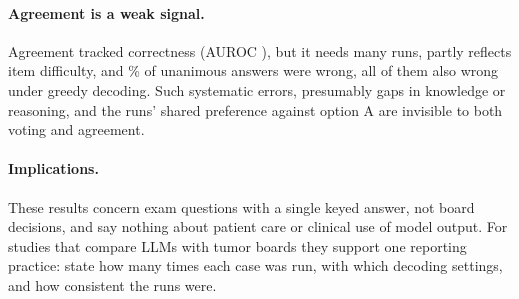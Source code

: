 \paragraph{Agreement is a weak signal.} Agreement tracked correctness (AUROC \auroc), but it needs many runs, partly
reflects item difficulty, and \unanimousWrongPct\% of unanimous answers were wrong, all of them also wrong under greedy
decoding. Such systematic errors, presumably gaps in knowledge or reasoning, and the runs' shared preference against
option A are invisible to both voting and agreement.

\paragraph{Implications.} These results concern exam questions with a single keyed answer, not board decisions, and say
nothing about patient care or clinical use of model output. For studies that compare LLMs with tumor boards they
support one reporting practice: state how many times each case was run, with which decoding settings, and how
consistent the runs were.
